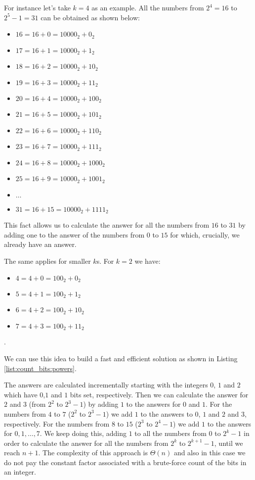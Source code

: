 For instance let's take $k=4$ as an example. All the numbers from $2^4 = 16$ to $2^5-1 = 31$ can be
obtained as shown below:
\begin{itemize}
	\item $16 = 16+0 = 10000_2+ 0_2$
	\item $17 = 16+1 = 10000_2+ 1_2$
	\item $18 = 16+2 = 10000_2+ 10_2$
	\item $19 = 16+3 = 10000_2+ 11_2$
	\item $20 = 16+4 = 10000_2+ 100_2$
	\item $21 = 16+5 = 10000_2+ 101_2$
	\item $22 = 16+6 = 10000_2+ 110_2$
	\item $23 = 16+7 = 10000_2+ 111_2$
	\item $24 = 16+8 = 10000_2+ 1000_2$
	\item $25 = 16+9 = 10000_2+ 1001_2$
	\item $\ldots$
	\item $31 = 16+15 = 10000_2+ 1111_2$
\end{itemize}
This fact allows us to calculate the answer for all the numbers from $16$ to $31$  by adding one to the answer of the numbers from $0$ to $15$ for which, crucially, we already have an answer.

The same applies for smaller $k$s. For $k=2$ we have:
\begin{itemize}
	\item $4 = 4+0 = 100_2+ 0_2$
	\item $5 = 4+1 = 100_2+ 1_2$
	\item $6 = 4+2 = 100_2+ 10_2$
	\item $7 = 4+3 = 100_2+ 11_2$
\end{itemize}.

We can use this idea to build a fast and efficient solution as shown in Listing \ref{list:count_bits:powers}.



The answers are calculated incrementally starting with the integers $0$, $1$ and $2$ which have $0$,$1$ and $1$ bits set, respectively.
Then we can calculate the answer for $2$ and $3$ (from $2^2$ to $2^3-1$)
by adding $1$ to the answers for $0$ and $1$.
For the numbers from $4$ to $7$ ($2^2$ to $2^3-1$) we
add $1$ to the answers to $0$, $1$ and $2$ and $3$, respectively.
For the numbers from $8$ to $15$ ($2^3$ to
$2^4-1$) we add $1$ to the answers for $0, 1, \ldots,7$.
We keep doing this, adding $1$ to all the
numbers from $0$ to $2^k-1$ in order to calculate the answer for all the numbers from $2^k$ to
$2^{k+1}-1$, until we reach $n+1$.
The complexity of this approach is $\Theta(n)$ and also in this
case we do not pay the constant factor associated with a brute-force count of the bits in an
integer.


